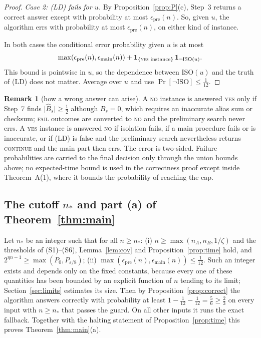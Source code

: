 \documentclass[11pt]{article}
\theoremstyle{definition}
\newtheorem{remark}[lemma]{Remark}
\newcommand{\eps}{\varepsilon}
\newcommand{\abs}[1]{\lvert #1\rvert}
\begin{document}
\begin{proof}
\emph{Case 2: \textup{(LD)} fails for $u$.} By Proposition~\ref{prop:P}(c), Step~3 returns a correct answer except
with probability at most $\epsilon_{\mathrm{pre}}(n)$. So, given $u$, the algorithm errs with probability at most
$\epsilon_{\mathrm{pre}}(n)$, on either kind of instance.

In both cases the conditional error probability given $u$ is at most
\[
 \max(\epsilon_{\mathrm{pre}}(n),\epsilon_{\mathrm{main}}(n))+\mathbf 1_{\{\textsc{yes}\text{ instance}\}}\,\mathbf 1_{\neg\mathrm{ISO}(u)} .
\]
This bound is pointwise in $u$, so the dependence between $\mathrm{ISO}(u)$ and the truth of \textup{(LD)} does not
matter. Average over $u$ and use $\Pr[\neg\mathrm{ISO}]\le\tfrac1{12}$.
\end{proof}

\begin{remark}[how a wrong answer can arise]\label{rem:errors}
A \textsc{no} instance is answered \textsc{yes} only if Step~7 finds $\abs{\hat B_s}\ge\tfrac12$ although $B_s=0$,
which requires an inaccurate alias sum or checksum; \textsc{fail} outcomes are converted to \textsc{no} and the
preliminary search never errs. A \textsc{yes} instance is answered \textsc{no} if isolation fails, if a main
procedure fails or is inaccurate, or if \textup{(LD)} is false and the preliminary search nevertheless returns
\textsc{continue} and the main part then errs. The error is two-sided. Failure probabilities are carried to the
final decision only through the union bounds above; no expected-time bound is used in the correctness proof except
inside Theorem~A(1), where it bounds the probability of reaching the cap.
\end{remark}

\subsection{The cutoff $n_\ast$ and part (a) of Theorem~\ref{thm:main}}\label{sec:nstar}
Let $n_\ast$ be an integer such that for all $n\ge n_\ast$: (i) $n\ge\max(n_A,n_B,1/\zeta)$ and the thresholds of
\textup{(S1)--(S6)}, Lemma~\ref{lem:cov} and Proposition~\ref{prop:time} hold, and $2^{\eta n-1}\ge\max(P_0,P_{\eps/8})$;
(ii) $\max(\epsilon_{\mathrm{pre}}(n),\epsilon_{\mathrm{main}}(n))\le\tfrac1{12}$. Such an integer exists and depends
only on the fixed constants, because every one of these quantities has been bounded by an explicit function of $n$
tending to its limit; Section~\ref{sec:limits} estimates its size. Then by Proposition~\ref{prop:correct} the
algorithm answers correctly with probability at least $1-\tfrac1{12}-\tfrac1{12}=\tfrac56\ge\tfrac23$ on every input
with $n\ge n_\ast$ that passes the guard. On all other inputs it runs the exact fallback. Together with the halting
statement of Proposition~\ref{prop:time} this proves Theorem~\ref{thm:main}(a).
\end{document}
